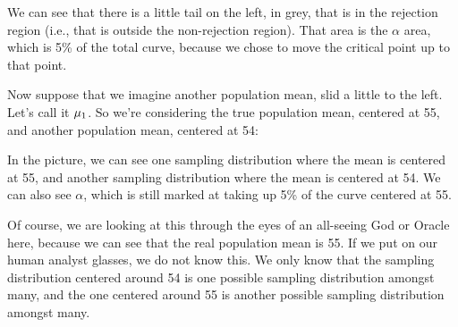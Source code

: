 \documentclass[../../../main.tex]{subfiles}
\begin{document}
\noindent
We can see that there is a little tail on the left, in grey, that is in the rejection region (i.e., that is outside the non-rejection region). That area is the $\alpha$ area, which is 5\% of the total curve, because we chose to move the critical point up to that point.

Now suppose that we imagine another population mean, slid a little to the left. Let's call it $\mu_{1}$. So we're considering the true population mean, centered at 55, and another population mean, centered at 54:

\begin{center}
\end{center}

\noindent
In the picture, we can see one sampling distribution where the mean is centered at 55, and another sampling distribution where the mean is centered at 54. We can also see $\alpha$, which is still marked at taking up 5\% of the curve centered at 55. 

Of course, we are looking at this through the eyes of an all-seeing God or Oracle here, because we can see that the real population mean is 55. If we put on our human analyst glasses, we do not know this. We only know that the sampling distribution centered around 54 is one possible sampling distribution amongst many, and the one centered around 55 is another possible sampling distribution amongst many.
\end{document}
